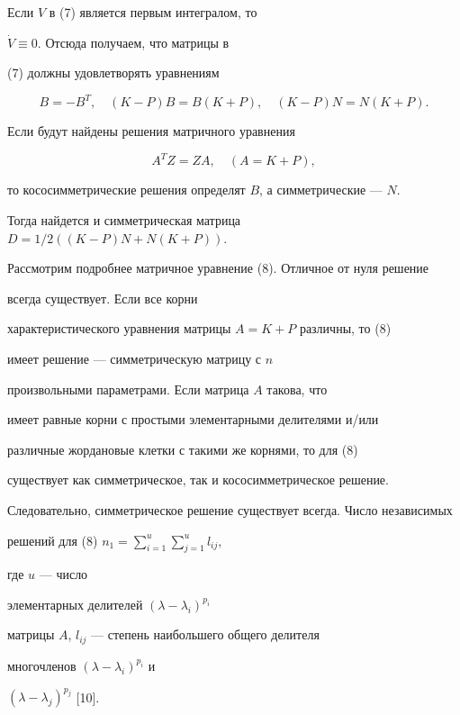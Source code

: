 Если $V$ в (7) является первым интегралом, то


$\Dot{V}\equiv{0}$. Отсюда получаем, что матрицы в


(7) должны удовлетворять уравнениям


$$


B=-B^{T},\quad (K-P)B=B(K+P), \quad (K-P)N=N(K+P).


$$


Если будут найдены решения матричного уравнения


\begin{equation}


A^{T}Z=ZA, \quad (A=K+P), \tag{8}


\end{equation}


то кососимметрические решения определят $B$, а симметрические --- $N$.


Тогда найдется и симметрическая матрица $D=1/2((K-P)N+N(K+P))$.





Рассмотрим подробнее матричное уравнение (8). Отличное от нуля решение


всегда существует. Если все корни


характеристического уравнения матрицы $A=K+P$ различны, то (8)


имеет решение --- симметрическую матрицу с $n$


произвольными параметрами. Если матрица $A$ такова, что


имеет равные корни с простыми элементарными делителями и/или


различные жордановые клетки с такими же корнями, то для (8)


существует как симметрическое, так и кососимметрическое решение.


Следовательно, симметрическое решение существует всегда. Число независимых


решений для (8) $n_{1}= \sum\limits_{i=1}^{u} \sum\limits_{j=1}^{u}l_{ij},$


где $u$ --- число


элементарных делителей $( \lambda- \lambda_{i})^{p_{i}}$


матрицы $A$, $l_{ij}$ --- степень наибольшего общего делителя


многочленов $( \lambda- \lambda_{i})^{p_{i}}$ и


$( \lambda- \lambda_{j})^{p_{j}}$ [10].


\medskip





